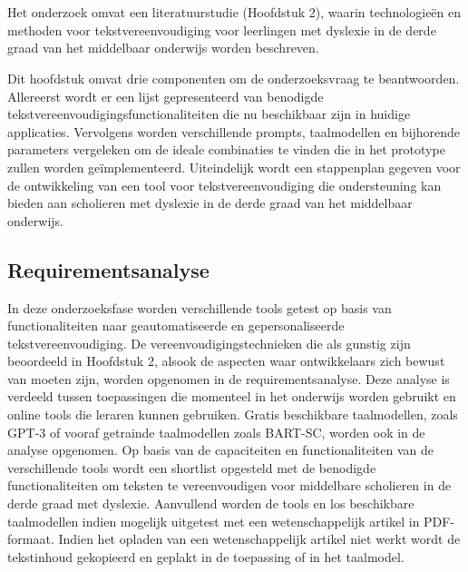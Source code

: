 
\chapter{}%
\label{ch:methodologie}

Het onderzoek omvat een literatuurstudie (Hoofdstuk 2), waarin technologieën en methoden voor tekstvereenvoudiging voor leerlingen met dyslexie in de derde graad van het middelbaar onderwijs worden beschreven. 

Dit hoofdstuk omvat drie componenten om de onderzoeksvraag te beantwoorden. Allereerst wordt er een lijst gepresenteerd van benodigde tekstvereenvoudigingsfunctionaliteiten die nu beschikbaar zijn in huidige applicaties. Vervolgens worden verschillende prompts, taalmodellen en bijhorende parameters vergeleken om de ideale combinaties te vinden die in het prototype zullen worden geïmplementeerd. Uiteindelijk wordt een stappenplan gegeven voor de ontwikkeling van een tool voor tekstvereenvoudiging die ondersteuning kan bieden aan scholieren met dyslexie in de derde graad van het middelbaar onderwijs.

\section{Requirementsanalyse}

In deze onderzoeksfase worden verschillende tools getest op basis van functionaliteiten naar geautomatiseerde en gepersonaliseerde tekstvereenvoudiging. De vereenvoudigingstechnieken die als gunstig zijn beoordeeld in Hoofdstuk 2, alsook de aspecten waar ontwikkelaars zich bewust van moeten zijn, worden opgenomen in de requirementsanalyse. Deze analyse is verdeeld tussen toepassingen die momenteel in het onderwijs worden gebruikt en online tools die leraren kunnen gebruiken. Gratis beschikbare taalmodellen, zoals GPT-3 of vooraf getrainde taalmodellen zoals BART-SC, worden ook in de analyse opgenomen. Op basis van de capaciteiten en functionaliteiten van de verschillende tools wordt een shortlist opgesteld met de benodigde functionaliteiten om teksten te vereenvoudigen voor middelbare scholieren in de derde graad met dyslexie. Aanvullend worden de tools en los beschikbare taalmodellen indien mogelijk uitgetest met een wetenschappelijk artikel in PDF-formaat. Indien het opladen van een wetenschappelijk artikel niet werkt wordt de tekstinhoud gekopieerd en geplakt in de toepassing of in het taalmodel.

